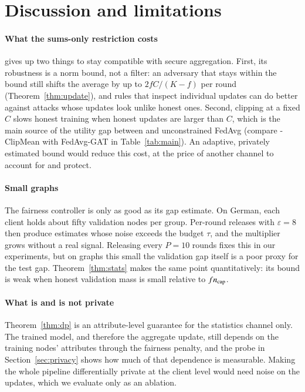 \section{Discussion and limitations}\label{sec:discussion}

\paragraph{What the sums-only restriction costs}
\clamp{} gives up two things to stay compatible with secure aggregation. First, its robustness is a norm bound, not a filter: an adversary that stays within the bound still shifts the average by up to $2fC/(K-f)$ per round (Theorem~\ref{thm:update}), and rules that inspect individual updates can do better against attacks whose updates look unlike honest ones. Second, clipping at a fixed $C$ slows honest training when honest updates are larger than $C$, which is the main source of the utility gap between \clamp{} and unconstrained FedAvg (compare \clamp{}-ClipMean with FedAvg-GAT in Table~\ref{tab:main}). An adaptive, privately estimated bound would reduce this cost, at the price of another channel to account for and protect.

\paragraph{Small graphs}
The fairness controller is only as good as its gap estimate. On German, each client holds about fifty validation nodes per group. Per-round releases with $\varepsilon=8$ then produce estimates whose noise exceeds the budget $\tau$, and the multiplier grows without a real signal. Releasing every $P=10$ rounds fixes this in our experiments, but on graphs this small the validation gap itself is a poor proxy for the test gap. Theorem~\ref{thm:stats} makes the same point quantitatively: its bound is weak when honest validation mass is small relative to $fn_{\mathrm{cap}}$.

\paragraph{What is and is not private}
Theorem~\ref{thm:dp} is an attribute-level guarantee for the statistics channel only. The trained model, and therefore the aggregate update, still depends on the training nodes' attributes through the fairness penalty, and the probe in Section~\ref{sec:privacy} shows how much of that dependence is measurable. Making the whole pipeline differentially private at the client level would need noise on the updates, which we evaluate only as an ablation.

